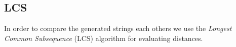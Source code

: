\subsection{LCS} 

In order to compare the generated strings each others we use the \emph{Longest Common Subsequence} (LCS) algorithm for evaluating distances.

 